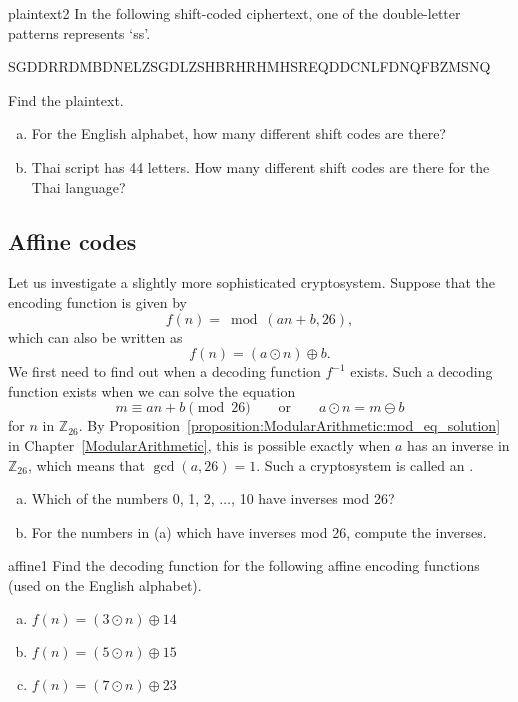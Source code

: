 \begin{exercise}{plaintext2}  
In the following shift-coded ciphertext,  one of the double-letter patterns represents `ss'. 

SGDDRRDMBDNELZSGDLZSHBRHRHMHSREQDDCNLFDNQFBZMSNQ

\noindent
Find the plaintext.
\end{exercise}

\begin{exercise}{}  
\begin{enumerate}[(a)]
\item
For the English alphabet, how many different shift codes are there?
\item
Thai script has 44 letters. How many different shift codes are there for the Thai language?
\end{enumerate}
\end{exercise}


\subsection{Affine codes}
\label{subsec:Cryptography:PrivateKey:AffineCode}
 
Let us investigate a slightly more sophisticated cryptosystem. Suppose
that the encoding function is given by  
$$
f(n) = \bmod(an + b,  26),
$$
which can also be written as
$$
f(n) = (a \odot n) \oplus b.
$$
We first need to find out when a decoding function $f^{-1}$ exists.
Such a decoding function exists when we can solve the equation
$$
m \equiv an + b \pmod{26}\qquad \textrm{or}\qquad a \odot n = m \ominus  b
$$
for $n$ in $\mathbb{Z}_{26}$. By Proposition~\ref{proposition:ModularArithmetic:mod_eq_solution} in Chapter~\ref{ModularArithmetic}, this is possible exactly when $a$ has an
inverse in $\mathbb{Z}_{26}$, which means that $\gcd( a, 26) =1$. 
Such a cryptosystem is called an . 
 
\begin{exercise}{}
\begin{enumerate}[(a)]
\item
Which of the numbers 0, 1, 2, $\dots$, 10 have inverses mod 26?
\item
For the numbers in (a) which have inverses mod 26, compute the inverses.
\end{enumerate}
\end{exercise}


\begin{exercise}{affine1}
Find the decoding function for the following  affine encoding functions (used on the English alphabet).
\begin{enumerate}[(a)]
\item
$f(n)=(3 \odot n) \oplus 14$
\item
$f(n)=(5 \odot n) \oplus 15$
\item
$f(n)=(7 \odot n) \oplus 23$
\end{enumerate}
\end{exercise}

